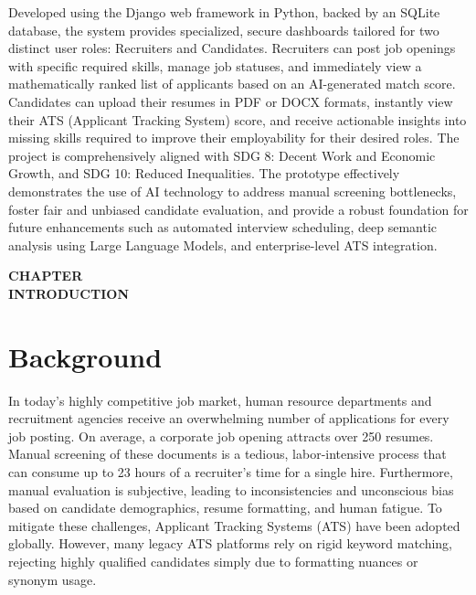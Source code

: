 \documentclass[12pt,a4paper]{report}
\newcommand{\chaptertitlepage}[1]{%
\cleardoublepage
\thispagestyle{empty}
\null
\vfill
\begin{center}
{\fontsize{16pt}{18pt}\selectfont\bfseries
CHAPTER \thechapter}\\[0.5cm]
{\fontsize{16pt}{18pt}\selectfont\bfseries
#1}
\end{center}
\vfill
\null
\clearpage
}
\begin{document}
\noindent Developed using the Django web framework in Python, backed by an SQLite database, the system provides specialized, secure dashboards tailored for two distinct user roles: Recruiters and Candidates. Recruiters can post job openings with specific required skills, manage job statuses, and immediately view a mathematically ranked list of applicants based on an AI-generated match score. Candidates can upload their resumes in PDF or DOCX formats, instantly view their ATS (Applicant Tracking System) score, and receive actionable insights into missing skills required to improve their employability for their desired roles. 
\noindent The project is comprehensively aligned with SDG 8: Decent Work and Economic Growth, and SDG 10: Reduced Inequalities. The prototype effectively demonstrates the use of AI technology to address manual screening bottlenecks, foster fair and unbiased candidate evaluation, and provide a robust foundation for future enhancements such as automated interview scheduling, deep semantic analysis using Large Language Models, and enterprise-level ATS integration.
\clearpage
{}
\pagestyle{empty}
\tableofcontents
\clearpage
\listoffigures
\listoftables
\clearpage
{}
\pagestyle{maincontent}

\chaptertitlepage{INTRODUCTION}
\section{Background}
\noindent In today's highly competitive job market, human resource departments and recruitment agencies receive an overwhelming number of applications for every job posting. On average, a corporate job opening attracts over 250 resumes. Manual screening of these documents is a tedious, labor-intensive process that can consume up to 23 hours of a recruiter’s time for a single hire. Furthermore, manual evaluation is subjective, leading to inconsistencies and unconscious bias based on candidate demographics, resume formatting, and human fatigue. To mitigate these challenges, Applicant Tracking Systems (ATS) have been adopted globally. However, many legacy ATS platforms rely on rigid keyword matching, rejecting highly qualified candidates simply due to formatting nuances or synonym usage.
\end{document}
